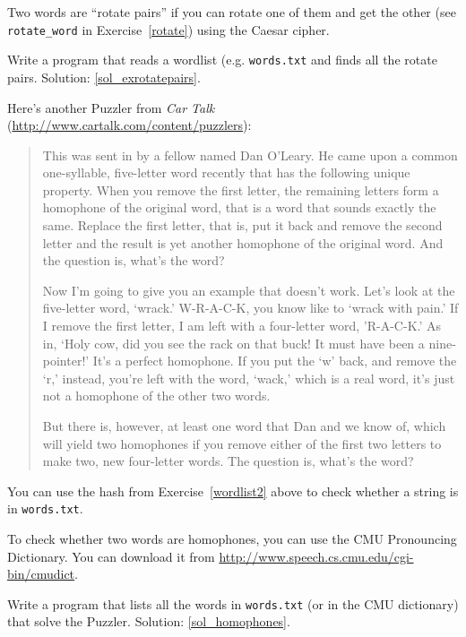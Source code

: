 \begin{exercise}
\label{exrotatepairs}

Two words are ``rotate pairs'' if you can rotate one of them
and get the other (see \verb"rotate_word" in 
Exercise~\ref{rotate}) using the Caesar cipher.

Write a program that reads a wordlist (e.g. {\tt words.txt} 
and finds all the rotate pairs.  
Solution: \ref{sol_exrotatepairs}.

\end{exercise}


\begin{exercise}
\label{homophones}

Here's another Puzzler from {\em Car Talk} 
(\url{http://www.cartalk.com/content/puzzlers}):

\begin{quote}
This was sent in by a fellow named Dan O'Leary. He came upon a common
one-syllable, five-letter word recently that has the following unique
property. When you remove the first letter, the remaining letters form
a homophone of the original word, that is a word that sounds exactly
the same. Replace the first letter, that is, put it back and remove
the second letter and the result is yet another homophone of the
original word. And the question is, what's the word?

Now I'm going to give you an example that doesn't work. Let's look at
the five-letter word, `wrack.' W-R-A-C-K, you know like to `wrack with
pain.' If I remove the first letter, I am left with a four-letter
word, 'R-A-C-K.' As in, `Holy cow, did you see the rack on that buck!
It must have been a nine-pointer!' It's a perfect homophone. If you
put the `w' back, and remove the `r,' instead, you're left with the
word, `wack,' which is a real word, it's just not a homophone of the
other two words.

But there is, however, at least one word that Dan and we know of,
which will yield two homophones if you remove either of the first two
letters to make two, new four-letter words. The question is, what's
the word?
\end{quote}

You can use the hash from Exercise~\ref{wordlist2} above to check
whether a string is in {\tt words.txt}.

To check whether two words are homophones, you can use the CMU
Pronouncing Dictionary.  You can download it from
\url{http://www.speech.cs.cmu.edu/cgi-bin/cmudict}.

Write a program that lists all the words in {\tt words.txt} 
(or in the CMU dictionary) that solve the Puzzler.
Solution: \ref{sol_homophones}.

\end{exercise}


